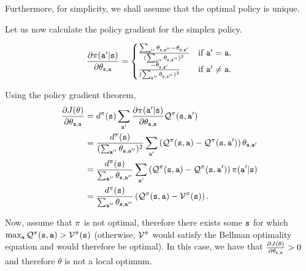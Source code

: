 Furthermore, for simplicity, we shall assume that the optimal policy is unique.

Let us now calculate the policy gradient for the simplex policy.

\begin{equation*}
    \frac{\partial \pi({\tt a}'|{\tt s})}{\partial \theta_{{\tt s},{\tt a}}} = \begin{cases}
        \frac{\sum_{{\tt a}''} \theta_{{\tt s},{\tt a}''} - \theta_{{\tt s},{\tt a}'}}{(\sum_{{\tt a}''} \theta_{{\tt s},{\tt a}''})^2} & \text{if } {\tt a}' = {\tt a}, \\
\frac{ - \theta_{{\tt s},{\tt a}'}}{(\sum_{{\tt a}''} \theta_{{\tt s},{\tt a}''})^2} & \text{if } {\tt a}' \neq {\tt a}.
    \end{cases}
\end{equation*}

Using the policy gradient theorem,
\begin{equation*}
\begin{split}
    \frac{\partial J(\theta)}{\partial \theta_{{\tt s},{\tt a}}}  &= d^{\pi}({\tt s}) \sum_{{\tt a}'} \frac{\partial \pi({\tt a}'|{\tt s})}{\partial \theta_{{\tt s},{\tt a}}}\mathcal{Q}^{\pi}({\tt s},{\tt a}')\\
    &= \frac{d^{\pi}({\tt s})}{(\sum_{{\tt a}''} \theta_{{\tt s},{\tt a}''})^2} \sum_{{\tt a}'} \left(\mathcal{Q}^{\pi}({\tt s},{\tt a}) - \mathcal{Q}^{\pi}({\tt s},{\tt a}') \right)\theta_{{\tt s},{\tt a}'} \\
    &= \frac{d^{\pi}({\tt s})}{\sum_{{\tt a}''} \theta_{{\tt s},{\tt a}''}} \sum_{{\tt a}'} \left(\mathcal{Q}^{\pi}({\tt s},{\tt a}) - \mathcal{Q}^{\pi}({\tt s},{\tt a}') \right)\pi({\tt a}'|{\tt s}) \\
    &=\frac{d^{\pi}({\tt s})}{\sum_{{\tt a}''} \theta_{{\tt s},{\tt a}''}}\left(\mathcal{Q}^{\pi}({\tt s},{\tt a}) - \mathcal{V}^{\pi}({\tt s}) \right).
\end{split}  
\end{equation*}

Now, assume that $\pi$ is not optimal, therefore there exists some ${\tt s}$ for which $\max_{{\tt a}} \mathcal{Q}^{\pi}({\tt s},{\tt a}) > \mathcal{V}^{\pi}({\tt s})$ (otherwise, $\mathcal{V}^{\pi}$ would satisfy the Bellman optimality equation and would therefore be optimal). In this case, we have that $\frac{\partial J(\theta)}{\partial \theta_{{\tt s},{\tt a}}} > 0$ and therefore $\theta$ is not a local optimum.

